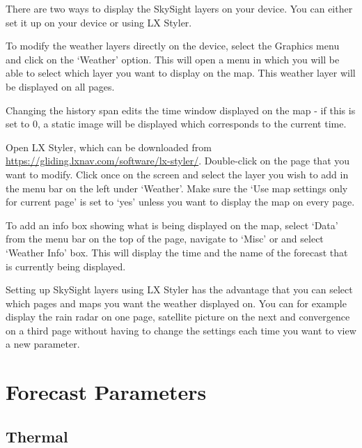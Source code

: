 \documentclass[11pt,a4paper]{article}
\begin{document}
There are two ways to display the SkySight layers on your device. You can either set it up on your device or using LX Styler.

To modify the weather layers directly on the device, select the Graphics menu and click on the `Weather' option. This will open a menu in which you will be able to select which layer you want to display on the map. This weather layer will be displayed on all pages. 

\begin{tip}
\item Changing the history span edits the time window displayed on the map - if this is set to 0, a static image will be displayed which corresponds to the current time.
\end{tip}

Open LX Styler, which can be downloaded from \url{https://gliding.lxnav.com/software/lx-styler/}. Double-click on the page that you want to modify. Click once on the screen and select the layer you wish to add in the menu bar on the left under `Weather'. Make sure the `Use map settings only for current page' is set to `yes' unless you want to display the map on every page.

To add an info box showing what is being displayed on the map, select `Data' from the menu bar on the top of the page, navigate to `Misc' or and select `Weather Info' box. This will display the time and the name of the forecast that is currently being displayed.

Setting up SkySight layers using LX Styler has the advantage that you can select which pages and maps you want the weather displayed on. You can for example display the rain radar on one page, satellite picture on the next and convergence on a third page without having to change the settings each time you want to view a new parameter.  



\pagebreak
\appendix
\section{Forecast Parameters}

\subsection{Thermal}
\end{document}
